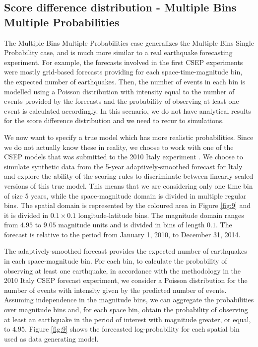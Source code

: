 \documentclass[referee,sn-basic]{sn-jnl}
\theoremstyle{thmstyleone}%
\theoremstyle{thmstyletwo}%
\theoremstyle{thmstylethree}%
\begin{document}
\subsection{ Score difference distribution - Multiple Bins Multiple Probabilities }

The Multiple Bins Multiple Probabilities case generalizes the Multiple Bins Single Probability case, and is much more similar to a real earthquake forecasting experiment. For example, the forecasts involved in the first CSEP experiments \citep{field2007overview, schorlemmer2007relm, zechar2013regional, michael2018preface} were mostly grid-based forecasts providing for each space-time-magnitude bin, the expected number of earthquakes. Then, the number of events in each bin is modelled using a Poisson distribution with intensity equal to the number of events provided by the forecasts and the probability of observing at least one event is calculated accordingly. In this scenario, we do not have analytical results for the score difference distribution and we need to recur to simulations.

We now want to specify a true model which has more realistic probabilities. Since we do not actually know these in reality, we choose to work with one of the CSEP models that was submitted to the 2010 Italy experiment \citep{taroni2018prospective}. We choose to simulate synthetic data from the 5-year adaptively-smoothed forecast for Italy \citep{werner2010adaptively} and explore the ability of the scoring rules to discriminate between linearly scaled versions of this true model. This means that we are considering only one time bin of size 5 years, while the space-magnitude domain is divided in multiple regular bins. The spatial domain is represented by the coloured area in Figure \ref{fig:9} and it is divided in $0.1 \times 0.1$ longitude-latitude bins. The magnitude domain ranges from $4.95$ to $9.05$ magnitude units and is divided in bins of length $0.1$. The forecast is relative to the period from January 1, 2010, to December 31, 2014.

The adaptively-smoothed forecast provides the expected number of earthquakes in each space-magnitude bin. For each bin, to calculate the probability of observing at least one earthquake, in accordance with the methodology in the 2010 Italy CSEP forecast experiment, we consider a Poisson distribution for the number of events with intensity given by the predicted number of events. Assuming independence in the magnitude bins, we can aggregate the probabilities over magnitude bins and, for each space bin, obtain the probability of observing at least an earthquake in the period of interest with magnitude greater, or equal, to $4.95$. Figure \ref{fig:9} shows the forecasted log-probability for each spatial bin used as data generating model. 
\end{document}
